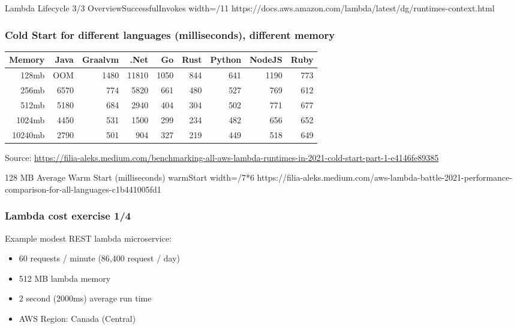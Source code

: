 \documentclass[11pt,aspectratio=169]{beamer}
\begin{document}
\nrcanGraphicFrame
  {Lambda Lifecycle 3/3}
  {OverviewSuccessfulInvokes}
  {width=/11}
  {https://docs.aws.amazon.com/lambda/latest/dg/runtimes-context.html}



\begin{nrcanFrame}
  \frametitle{Cold Start for different languages (milliseconds), different memory}
  \centering
  \begin{table}
  \begin{tabular}{|r||r|r|r|r|r|r|r|r|}\hline    \hline
    \bf Memory      &\bf Java 	&\bf Graalvm& \bf .Net &	\bf Go& 	\bf Rust& 	\bf Python& 	\bf NodeJS& 	\bf Ruby\\ \hline
    128mb 	&OOM 	&1480 &	  11810 &	1050 &	844 &	641 &	        1190 &	773\\ \hline
    256mb 	&6570 &	774 &	  5820 &	661 &	480 &	527 &	        769 &	612\\ \hline
    512mb 	&5180 &	684 &	  2940 &	404 &	304 &	502 &	        771 &	677\\ \hline
    1024mb 	&4450 &	531 &	  1500 &	299 &	234 &	482 &	        656 &	652\\ \hline
    10240mb     &2790 &	501 &	  904 &	        327 &	219 &	449 &	        518 &	649\\ \hline
      \hline 
  \end{tabular}
  \end{table}

  {\tiny Source: \url{https://filia-aleks.medium.com/benchmarking-all-aws-lambda-runtimes-in-2021-cold-start-part-1-e4146fe89385}}
\end{nrcanFrame}



\nrcanGraphicFrame
  {128 MB Average Warm Start (milliseconds)}
  {warmStart}
  {width=\paperwidth/7*6}
  {https://filia-aleks.medium.com/aws-lambda-battle-2021-performance-comparison-for-all-languages-c1b441005fd1}


\begin{nrcanFrame}
  \frametitle{Lambda cost exercise 1/4}
  Example modest REST lambda microservice:
  \begin{itemize}
  \item 60 requests / minute (86,400 request / day)
  \item 512 MB lambda memory
  \item 2 second (2000ms) average run time
  \item AWS Region: Canada (Central)
  \end{itemize}
\end{nrcanFrame}
\end{document}
